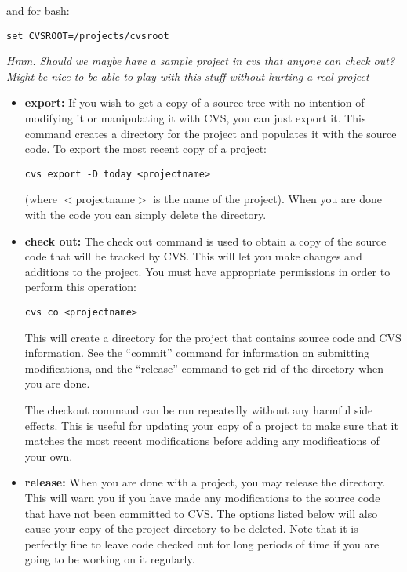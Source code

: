 \documentclass[11pt, letterpaper]{article}
\begin{document}
and for bash:
\begin{verbatim}
set CVSROOT=/projects/cvsroot
\end{verbatim}

\emph{Hmm. Should we maybe have a sample project in cvs that anyone can
check out?  Might be nice to be able to play with this stuff without
hurting a real project }

\begin{itemize}
	\item \textbf{export:} If you wish to get a copy of a source
	tree with no intention of modifying it or manipulating it with CVS,
	you can just export it.  This command creates a directory for the
	project and populates it with the source code.  To export the most
	recent copy of a project:
\begin{verbatim}
cvs export -D today <projectname>
\end{verbatim}
	(where $<$projectname$>$ is the name of the project).  When you are done with the
	code you can simply delete the directory.

	\item \textbf{check out:} The check out command is used to obtain a
	copy of the source code that will be tracked by CVS.  This will let
	you make changes and additions to the project.  You must have
	appropriate permissions in order to perform this operation:
\begin{verbatim}
cvs co <projectname>
\end{verbatim}
	This will create a directory for the project that contains
	source code and CVS information.  See the ``commit'' command for
	information on submitting modifications, and the ``release'' command to
	get rid of the directory when you are done.

	The checkout command can be run repeatedly without any harmful side
	effects.  This is useful for updating your copy of a project to make
	sure that it matches the most recent modifications before adding any
	modifications of your own.
	
	\item \textbf{release:} When you are done with a project, you may
	release the directory.  This will warn you if you have made any
	modifications to the source code that have not been committed to CVS.  The options listed below will also
	cause your copy of the project directory to be deleted.  Note that
	it is perfectly fine to leave code checked out for long periods of
	time if you are going to be working on it regularly.


\end{itemize}
\end{document}
